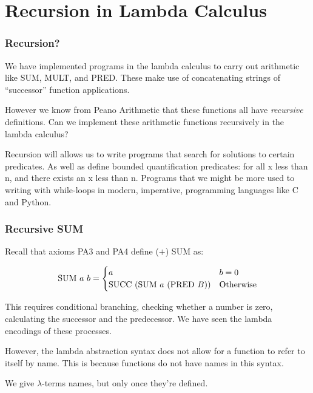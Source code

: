 \documentclass{beamer}
\begin{document}
\section{Recursion in Lambda Calculus}

\begin{frame}
  \frametitle{Recursion?}

  We have implemented programs in the lambda calculus to carry out arithmetic like SUM, MULT, and PRED. These make use of concatenating strings of ``successor'' function applications. 
  
  \vspace{2mm}

  However we know from Peano Arithmetic that these functions all have \emph{recursive} definitions. Can we implement these arithmetic functions recursively in the lambda calculus?

  \vspace{2mm}

  Recursion will allows us to write programs that search for solutions to certain predicates. As well as define bounded quantification predicates: for all x less than n, and there exists an x less than n. Programs that we might be more used to writing with while-loops in modern, imperative, programming languages like C and Python.

\end{frame}

\begin{frame}
  \frametitle{Recursive SUM}

	Recall that axioms PA3 and PA4 define ($+$) SUM as: 

  $$\text{SUM} \ a \ b = 
  \begin{cases}
    a & b = 0 \\
    \text{SUCC} \ (\text{SUM} \ a \ (\text{PRED} \ B)) & \text{Otherwise}
  \end{cases} $$

  This requires conditional branching, checking whether a number is zero, calculating the successor and the predecessor. We have seen the lambda encodings of these processes.

  \vspace{2mm}

  However, the lambda abstraction syntax does not allow for a function to refer to itself by name. This is because functions do not have names in this syntax. 

  \vspace{2mm}

  We give $\lambda$-terms names, but only once they're defined. 

\end{frame}
\end{document}
